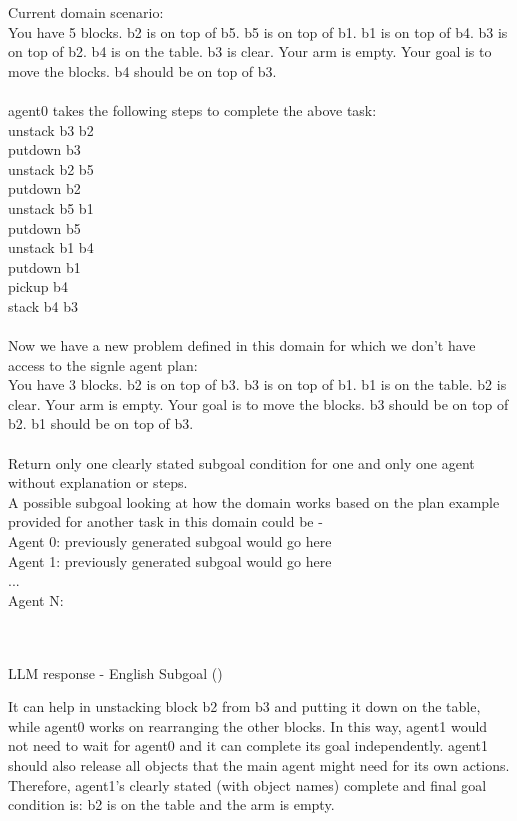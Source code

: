 \begin{tcolorbox}[redbox]
\begin{minipage}{0.95\columnwidth}
Current domain scenario:\\
You have 5 blocks. 
b2 is on top of b5. 
b5 is on top of b1. 
b1 is on top of b4. 
b3 is on top of b2. 
b4 is on the table. 
b3 is clear. 
Your arm is empty. 
Your goal is to move the blocks. 
b4 should be on top of b3.
\\ \\
agent0 takes the following steps to complete the above task:\\
unstack b3 b2\\
putdown b3\\
unstack b2 b5\\
putdown b2\\
unstack b5 b1\\
putdown b5\\
unstack b1 b4\\
putdown b1\\
pickup b4\\
stack b4 b3
\\ \\ 
Now we have a new problem defined in this domain for which we don't have access to the signle agent plan:\\
You have 3 blocks. 
b2 is on top of b3. 
b3 is on top of b1. 
b1 is on the table. 
b2 is clear. 
Your arm is empty. 
Your goal is to move the blocks. 
b3 should be on top of b2. 
b1 should be on top of b3.
\\ \\
Return only one clearly stated subgoal condition for one and only one agent without explanation or steps. \\A possible subgoal looking at how the domain works based on the plan example provided for another task in this domain could be - \\ 
Agent 0: {previously generated subgoal would go here}\\
Agent 1: {previously generated subgoal would go here}
\\...\\
Agent N: 
\end{minipage}
\end{tcolorbox} \\ \\
LLM response - English Subgoal (\blocks) \\
\begin{tcolorbox}[greenbox]
\begin{minipage}{0.95\columnwidth}
 It can help in unstacking block b2 from b3 and putting it down on the table, while agent0 works on rearranging the other blocks. In this way, agent1 would not need to wait for agent0 and it can complete its goal independently. agent1 should also release all objects that the main agent might need for its own actions. Therefore, agent1's clearly stated (with object names) complete and final goal condition is: b2 is on the table and the arm is empty.
\end{minipage}
\end{tcolorbox} \\ \\

